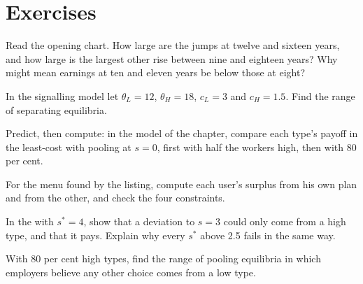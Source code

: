 \section{Exercises}\label{sec:b2:signalling-and-screening:exercises}

\begin{exercise}[$\star$]\label{exo:b2:signalling-and-screening:1}
Read the opening chart. How large are the jumps at twelve and sixteen years, and how large is the largest other rise
between nine and eighteen years? Why might mean earnings at ten and eleven years be below those at eight?
\end{exercise}

\begin{exercise}[$\star$]\label{exo:b2:signalling-and-screening:2}
In the signalling model let $\theta_L = 12$, $\theta_H = 18$, $c_L = 3$ and $c_H = 1.5$. Find the range of separating equilibria.
\end{exercise}

\begin{exercise}[$\star$]\label{exo:b2:signalling-and-screening:3}
Predict, then compute: in the model of the chapter, compare each type's payoff in the least-cost 
with pooling at $s = 0$, first with half the workers high, then with 80 per cent.
\end{exercise}

\begin{exercise}[$\star$]\label{exo:b2:signalling-and-screening:4}
For the menu found by the listing, compute each user's surplus from his own plan and from the other, and check the four
constraints.
\end{exercise}

\begin{exercise}[$\star\star$]\label{exo:b2:signalling-and-screening:5}
In the  with $s^* = 4$, show that a deviation to $s = 3$ could only come from a high type, and that it pays.
Explain why every $s^*$ above 2.5 fails in the same way.
\end{exercise}

\begin{exercise}[$\star\star$]\label{exo:b2:signalling-and-screening:6}
With 80 per cent high types, find the range of pooling equilibria in which employers believe any other choice comes from a
low type.
\end{exercise}

